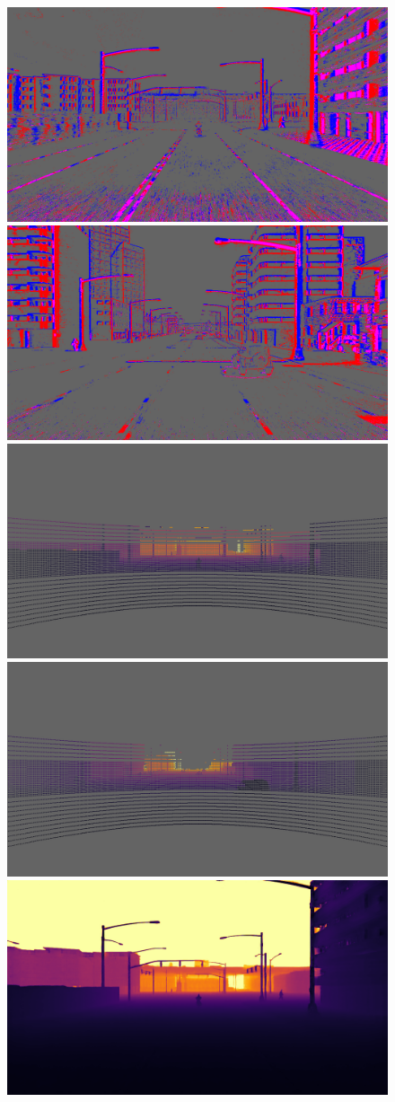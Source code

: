 \begin{figure}
  \centering
  \includegraphics[width=0.475\linewidth]{mainmatter/figures/b_depth_conv/sled_dense_cmp_additional/evts004386_lightgray_fixed.png}
  \includegraphics[width=0.475\linewidth]{mainmatter/figures/b_depth_conv/sled_dense_cmp_additional/evts005150_lightgray_fixed.png}
  \includegraphics[width=0.475\linewidth]{mainmatter/figures/b_depth_conv/sled_dense_cmp_additional/lidar004386_lightgray_fixed.png}
  \includegraphics[width=0.475\linewidth]{mainmatter/figures/b_depth_conv/sled_dense_cmp_additional/lidar005150_lightgray_fixed.png}
  \includegraphics[width=0.475\linewidth]{mainmatter/figures/b_depth_conv/sled_dense_cmp_additional/prev004386.png}

\end{figure}
